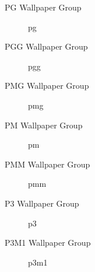 \begin{frame}{PG Wallpaper Group}
    \begin{figure}
        \centering
        
        \caption{pg}
        \label{fig:pg}
    \end{figure}
\end{frame}

\begin{frame}{PGG Wallpaper Group}
    \begin{figure}
        \centering
        
        \caption{pgg}
        \label{fig:pgg}
    \end{figure}
\end{frame}

\begin{frame}{PMG Wallpaper Group}
    \begin{figure}
        \centering
        
        \caption{pmg}
        \label{fig:pmg}
    \end{figure}
\end{frame}

\begin{frame}{PM Wallpaper Group}
    \begin{figure}
        \centering
        
        \caption{pm}
        \label{fig:pmm}
    \end{figure}
\end{frame}

\begin{frame}{PMM Wallpaper Group}
    \begin{figure}
        \centering
        
        \caption{pmm}
        \label{fig:pmm}
    \end{figure}
\end{frame}

\begin{frame}{P3 Wallpaper Group}
    \begin{figure}
        \centering
        
        \caption{p3}
        \label{fig:p3}
    \end{figure}
\end{frame}

\begin{frame}{P3M1 Wallpaper Group}
    \begin{figure}
        \centering
        
        \caption{p3m1}
        \label{fig:p3m1}
    \end{figure}
\end{frame}

